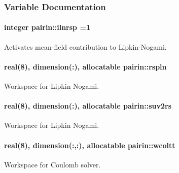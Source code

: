 \subsubsection{Variable Documentation}
\paragraph[{\texorpdfstring{ilnrsp}{ilnrsp}}]{\setlength{\rightskip}{0pt plus 5cm}integer pairin\+::ilnrsp =1}\hypertarget{namespacepairin_aad65b9e00f967e394d6c6abb1d8aeeea}{}\label{namespacepairin_aad65b9e00f967e394d6c6abb1d8aeeea}


Activates mean-\/field contribution to Lipkin-\/\+Nogami. 

\paragraph[{\texorpdfstring{rspln}{rspln}}]{\setlength{\rightskip}{0pt plus 5cm}real(8), dimension(\+:), allocatable pairin\+::rspln}\hypertarget{namespacepairin_acd8755c2a404fb12ebb6f7701675f293}{}\label{namespacepairin_acd8755c2a404fb12ebb6f7701675f293}


Workspace for Lipkin Nogami. 

\paragraph[{\texorpdfstring{suv2rs}{suv2rs}}]{\setlength{\rightskip}{0pt plus 5cm}real(8), dimension(\+:), allocatable pairin\+::suv2rs}\hypertarget{namespacepairin_a60a518945a929b696384f16087a9309b}{}\label{namespacepairin_a60a518945a929b696384f16087a9309b}


Workspace for Lipkin Nogami. 

\paragraph[{\texorpdfstring{wcoltt}{wcoltt}}]{\setlength{\rightskip}{0pt plus 5cm}real(8), dimension(\+:,\+:), allocatable pairin\+::wcoltt}\hypertarget{namespacepairin_a91f1c5ea0d945e465f4a156dd5b59a06}{}\label{namespacepairin_a91f1c5ea0d945e465f4a156dd5b59a06}


Workspace for Coulomb solver. 

